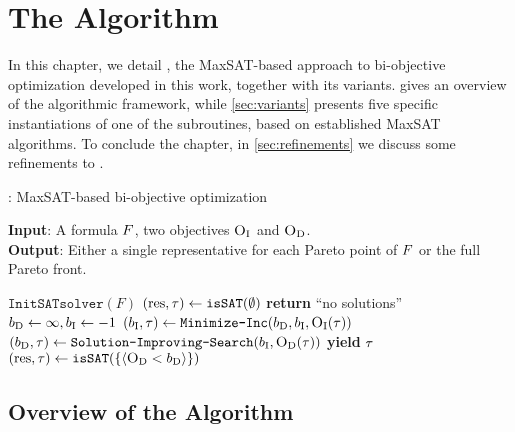 \chapter{The \algname{} Algorithm\label{chap:approach}}

In this chapter, we detail \algname{}, the MaxSAT-based approach to bi-objective optimization developed in this work, together with its variants.
 gives an overview of the algorithmic framework, while \cref{sec:variants} presents five specific instantiations of one of the subroutines, based on established MaxSAT algorithms.
To conclude the chapter, in \cref{sec:refinements} we discuss some refinements to \algname{}.

\begin{algorithm}[t]
  \caption{\algname{}: MaxSAT-based  bi-objective optimization} %
  \label{alg:base-algorithm}
  \textbf{Input}: A formula $F$, two objectives $\textsc{O}_{\text{I}}$ and $\textsc{O}_{\text{D}}$.\\
  \textbf{Output}: Either a single representative for each Pareto point of $F$ or the full Pareto front.

  \begin{algorithmic}[1]
    \STATE $\texttt{InitSATsolver}(F)$ \label{l:init-solv} 
    \STATE $(\text{res}, \tau) \gets \texttt{isSAT}(\emptyset)$ \quad{}\label{l:sols} 
    \IF{$\res=\unsat$}
      \STATE \textbf{return} ``no solutions''
    \ENDIF
    \STATE $b_{\text{D}} \gets \infty, b_{\text{I}} \gets -1$ \label{l:bounds}
    \WHILE{$\res = \sat$} \label{l:loopstart}
      \STATE $(b_{\text{I}}, \tau) \gets \texttt{Minimize-\allowbreak{}Inc}(b_{\text{D}} , b_{\text{I}}, \textsc{O}_{\text{I}}(\tau))$  \quad{}\label{l:minim1}
      \STATE $(b_{\text{D}}, \tau) \gets  \texttt{Solution-\allowbreak{}Improving-\allowbreak{}Search}(b_{\text{I}} , \textsc{O}_{\text{D}}(\tau))$  \quad{}\label{l:minim2}
      \STATE \textbf{yield} $\tau$  \quad{}\label{ln:stage3} 
      \STATE $(\text{res}, \tau) \gets \texttt{isSAT}(\{\langle \textsc{O}_{\text{D}} < b_{\text{D}} \rangle\})$\label{l:endL}
    \ENDWHILE
  \end{algorithmic}
\end{algorithm}

\section{Overview of the Algorithm\label{sec:algorithm}}

